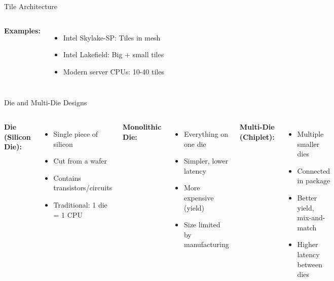 \documentclass[aspectratio=169,12pt]{beamer}
\begin{document}
\begin{frame}{Tile Architecture}
\begin{columns}[T]
\textbf{Examples:}
\begin{itemize}
\item Intel Skylake-SP: Tiles in mesh
\item Intel Lakefield: Big + small tiles
\item Modern server CPUs: 10-40 tiles
\end{itemize}
\end{columns}
\end{frame}

\begin{frame}{Die and Multi-Die Designs}
\begin{columns}[T]
\textbf{Die (Silicon Die):}
\begin{itemize}
\item Single piece of silicon
\item Cut from a wafer
\item Contains transistors/circuits
\item Traditional: 1 die = 1 CPU
\end{itemize}

\vspace{0.3cm}
\textbf{Monolithic Die:}
\begin{itemize}
\item Everything on one die
\item Simpler, lower latency
\item More expensive (yield)
\item Size limited by manufacturing
\end{itemize}

\vspace{0.3cm}
\textbf{Multi-Die (Chiplet):}
\begin{itemize}
\item Multiple smaller dies
\item Connected in package
\item Better yield, mix-and-match
\item Higher latency between dies
\end{itemize}

\begin{center}
\end{center}
\end{columns}
\end{frame}
\end{document}
